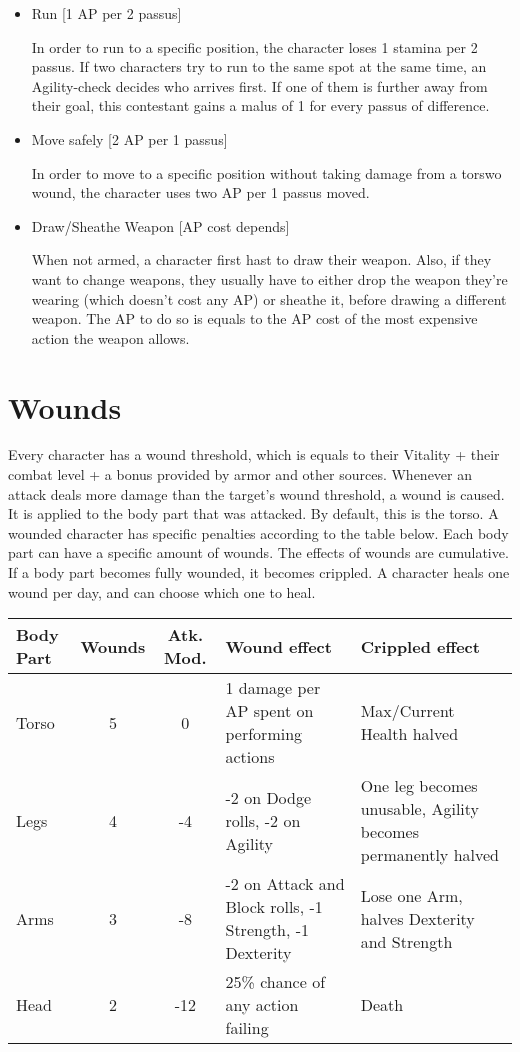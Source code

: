 \begin{itemize}
\item Run [1 AP per 2 passus]

In order to run to a specific position, the character loses 1 stamina per 2 passus. If two characters try to run to the same spot at the same time, an Agility-check decides who arrives first. If one of them is further away from their goal, this contestant gains a malus of 1 for every passus of difference.



\item Move safely [2 AP per 1 passus]

In order to move to a specific position without taking damage from a torswo wound, the character uses two AP per 1 passus moved.


\item Draw/Sheathe Weapon  [AP cost depends]

When not armed, a character first hast to draw their weapon. Also, if they want to change weapons, they usually have to either drop the weapon they're wearing (which doesn't cost any AP) or sheathe it, before drawing a different weapon. The AP to do so is equals to the AP cost of the most expensive action the weapon allows.


\end{itemize}

\section{Wounds}
Every character has a wound threshold, which is equals to their Vitality + their combat level + a bonus provided by armor and other sources. Whenever an attack deals more damage than the target's wound threshold, a wound is caused. It is applied to the body part that was attacked. By default, this is the torso. A wounded character has specific penalties according to the table below. Each body part can have a specific amount of wounds. The effects of wounds are cumulative. If a body part becomes fully wounded, it becomes crippled.
A character heals one wound per day, and can choose which one to heal.


\begin{tabular}{p{1cm} | c | c | p{4cm} | p{4cm}}
Body Part & Wounds & Atk. Mod. & Wound effect & Crippled effect \\ \hline
Torso & 5 & 0 & 1 damage per AP spent on performing actions & Max/Current Health halved\\
Legs & 4 & -4 & -2 on Dodge rolls, -2 on Agility & One leg becomes unusable, Agility becomes permanently halved \\
Arms & 3 & -8 & -2 on Attack and Block rolls, -1 Strength, -1 Dexterity & Lose one Arm, halves Dexterity and Strength\\
Head & 2 & -12 & 25\% chance of any action failing & Death\\
\end{tabular}
